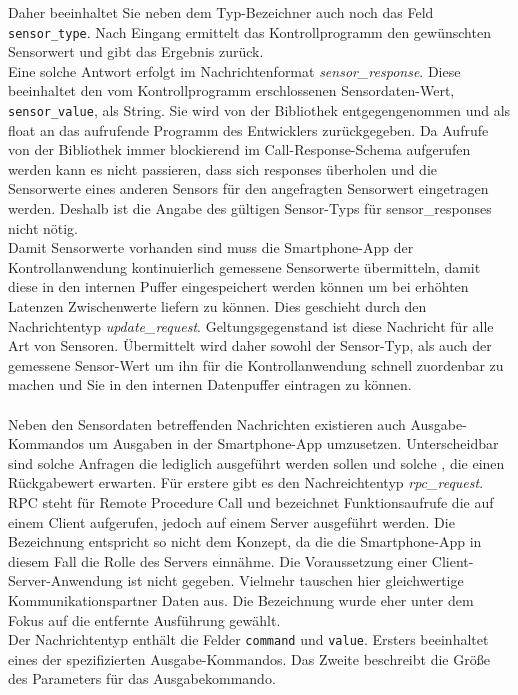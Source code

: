 \documentclass[11pt,a4paper]{report}
\begin{document}
Daher beeinhaltet Sie neben dem Typ-Bezeichner auch noch das Feld \texttt{sensor\_type}.
Nach Eingang ermittelt das Kontrollprogramm den gewünschten Sensorwert und gibt das Ergebnis zurück.
\\
Eine solche Antwort erfolgt im Nachrichtenformat \textit{sensor\_response}.
Diese beeinhaltet den vom Kontrollprogramm erschlossenen Sensordaten-Wert, \texttt{sensor\_value}, als String.
Sie wird von der Bibliothek entgegengenommen und als float an das aufrufende Programm des Entwicklers zurückgegeben.
Da Aufrufe von der Bibliothek immer blockierend im Call-Response-Schema aufgerufen werden kann es nicht passieren, dass sich responses überholen und die Sensorwerte eines anderen Sensors für den angefragten Sensorwert eingetragen werden.
Deshalb ist die Angabe des gültigen Sensor-Typs für sensor\_responses nicht nötig.
\\
Damit Sensorwerte vorhanden sind muss die Smartphone-App der Kontrollanwendung kontinuierlich gemessene Sensorwerte übermitteln, damit diese in den internen Puffer eingespeichert werden können um bei erhöhten Latenzen Zwischenwerte liefern zu können.
Dies geschieht durch den Nachrichtentyp \textit{update\_request}.
Geltungsgegenstand ist diese Nachricht für alle Art von Sensoren.
Übermittelt wird daher sowohl der Sensor-Typ, als auch der gemessene Sensor-Wert um ihn für die Kontrollanwendung schnell zuordenbar zu machen und Sie in den internen Datenpuffer eintragen zu können.
\\\\
Neben den Sensordaten betreffenden Nachrichten existieren auch Ausgabe-Kommandos um Ausgaben in der Smartphone-App umzusetzen.
Unterscheidbar sind solche Anfragen die lediglich ausgeführt werden sollen und solche , die einen Rückgabewert erwarten.
Für erstere gibt es den Nachreichtentyp \textit{rpc\_request}.
RPC steht für Remote Procedure Call und bezeichnet Funktionsaufrufe die auf einem Client aufgerufen, jedoch auf einem Server ausgeführt werden.
Die Bezeichnung entspricht so nicht dem Konzept, da die die Smartphone-App in diesem Fall die Rolle des Servers einnähme.
Die Voraussetzung einer Client-Server-Anwendung ist nicht gegeben.
Vielmehr tauschen hier gleichwertige Kommunikationspartner Daten aus.
Die Bezeichnung wurde eher unter dem Fokus auf die entfernte Ausführung gewählt.
\\
Der Nachrichtentyp enthält die Felder \texttt{command} und \texttt{value}.
Ersters beeinhaltet eines der spezifizierten Ausgabe-Kommandos.
Das Zweite beschreibt die Größe des Parameters für das Ausgabekommando.
\end{document}

